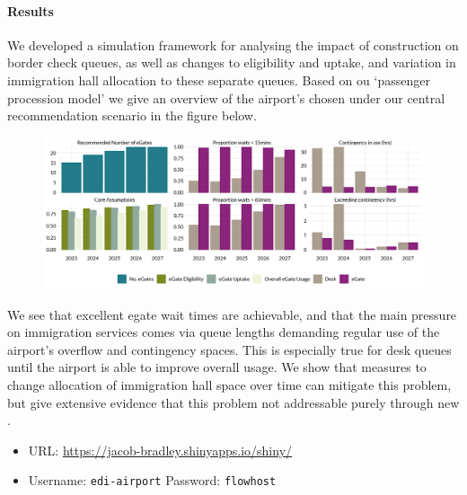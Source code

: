 \documentclass[10pt]{article}
\begin{document}
\paragraph{Results}
We developed a simulation framework for analysing the impact of  construction on border check queues, as well as changes to  eligibility and uptake, and variation in immigration hall allocation to these separate queues. Based on ou `passenger procession model' we give an overview of the airport's chosen  under our central recommendation scenario in the figure below. %
\begin{figure}[!h]
    \centering
    \includegraphics[width=\textwidth]{figures/core_rec_fig.png}
\end{figure}

\vspace{-5pt}

We see that excellent \gls{egate} wait times are achievable, and that the main pressure on immigration services comes via queue lengths demanding regular use of the airport's overflow and contingency spaces. This is especially true for desk queues until the airport is able to improve overall  usage. We show that measures to change allocation of immigration hall space over time can mitigate this problem, but give extensive evidence that this problem not addressable purely through new . 


\begin{tcolorbox}[
colframe=edi-dark-purple,
colback=edi-light-purple,
fonttitle=\bfseries,
title = {Use our Shiny Application to interactively explore demand scenarios!}]
\begin{itemize}
\item URL: \url{https://jacob-bradley.shinyapps.io/shiny/}
\item Username: \texttt{edi-airport} \quad Password: \texttt{flowhost}
\end{itemize}
\end{tcolorbox}
\end{document}
